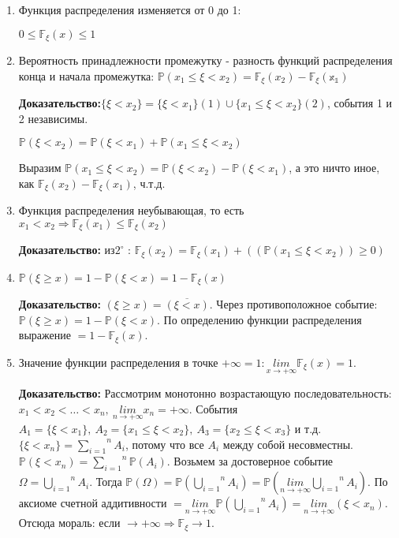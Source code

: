 \documentclass[../Main.tex]{subfiles}
\begin{document}
\begin{enumerate}
    \item Функция распределения изменяется от 0 до 1:
    
    \(0 \leq \mathbb{F}_\xi(x) \leq 1\)
    \item Вероятность принадлежности промежутку - разность функций распределения конца и начала промежутка: \(\mathbb{P}(x_1 \leq \xi < x_2) = \mathbb{F}_\xi(x_2) - \mathbb{F_\xi(x_1)}\)

    \textbf{Доказательство:}\(\{ \xi < x_2\} = \{\xi < x_1\}(1) \cup \{x_1 \leq \xi < x_2\}(2)\), события 1 и 2 независимы.
    
    \(\mathbb{P}(\xi < x_2) = \mathbb{P}(\xi < x_1) + \mathbb{P}(x_1 \leq \xi < x_2)\)

    Выразим \(\mathbb{P}(x_1 \leq \xi < x_2) = \mathbb{P}(\xi < x_2) - \mathbb{P}(\xi < x_1)\), а это ничто иное, как \(\mathbb{F}_\xi(x_2) - \mathbb{F}_\xi(x_1)\), ч.т.д.
    
    \item Функция распределения неубывающая, то есть \(x_1 < x_2 \Rightarrow \mathbb{F}_\xi(x_1) \leq \mathbb{F}_\xi (x_2)\)

    \textbf{Доказательство:} \(из 2^\circ\) : \(\mathbb{F}_\xi(x_2)=\mathbb{F}_\xi(x_1) + ((\mathbb{P}(x_1 \leq \xi < x_2)) \geq 0)\)
    \item \(\mathbb{P}(\xi \geq x) = 1 - \mathbb{P}(\xi < x) = 1 - \mathbb{F}_\xi (x)\)

    \textbf{Доказательство:} \((\xi \geq x) = \overline{(\xi < x)}\). Через противоположное событие: 
    \(\mathbb{P}(\xi \geq x) = 1 - \mathbb{P}(\xi < x)\). По определению функции распределения выражение \(= 1 - \mathbb{F}_\xi (x)\).

    \item Значение функции распределения в точке \(+\infty=1 : \underset{{x \rightarrow +\infty}}{lim}{\mathbb{F}_\xi(x)=1}\).
    
    \textbf{Доказательство:} Рассмотрим монотонно возрастающую последовательность: \(x_1 < x_2 < \dots < x_n, \ \underset{n \rightarrow + \infty}{lim}x_n = + \infty\). События \(A_1 = \{ \xi < x_1\},\ A_2 = \{ x_1 \leq \xi < x_2\},\ A_3 = \{x_2 \leq \xi < x_3\}\) и т.д. \Rightarrow \(\{ \xi < x_n \} = \overset{n}{\underset{i=1}{\sum}}A_i\), потому что все \(A_i\) между собой несовместны. \(\mathbb{P}(\xi < x_n) =\overset{n}{\underset{i=1}{\sum}}\mathbb{P}(A_i)\). Возьмем за достоверное событие \(\Omega = \overset{n}{\underset{i=1}{\bigcup}}A_i\). Тогда \(\mathbb{P}(\Omega)=\mathbb{P}(\overset{n}{\underset{i=1}{\bigcup}}A_i) = \mathbb{P}(\underset{n \rightarrow + \infty}{lim}\overset{n}{\underset{i=1}{\bigcup}}A_i)\). По аксиоме счетной аддитивности \(= \underset{n \rightarrow +\infty}{lim} \mathbb{P}(\overset{n}{\underset{i=1}{\bigcup}}A_i) = \underset{n \rightarrow + \infty}{lim}(\xi < x_n)\). Отсюда мораль: если \( \rightarrow +\infty \Rightarrow \mathbb{F}_\xi \rightarrow 1\).


\end{enumerate}
\end{document}
